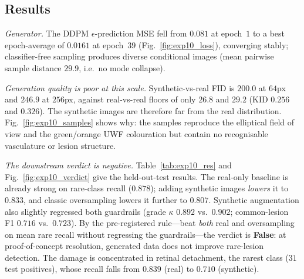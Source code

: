\documentclass[journal,twoside,web]{ieeecolor}
\begin{document}
\subsection{Results}
\emph{Generator.} The DDPM $\epsilon$-prediction MSE fell from $0.081$ at epoch~$1$ to
a best epoch-average of $\mathbf{0.0161}$ at epoch~$39$ (Fig.~\ref{fig:exp10_loss}),
converging stably; classifier-free sampling produces diverse conditional images (mean
pairwise sample distance $29.9$, i.e.\ no mode collapse).

\emph{Generation quality is poor at this scale.} Synthetic-vs-real FID is $200.0$ at
$64$px and $246.9$ at $256$px, against real-vs-real floors of only $26.8$ and $29.2$
(KID $0.256$ and $0.326$). The synthetic images are therefore far from the real
distribution. Fig.~\ref{fig:exp10_samples} shows why: the samples reproduce the
elliptical field of view and the green/orange UWF colouration but contain no
recognisable vasculature or lesion structure.

\emph{The downstream verdict is negative.} Table~\ref{tab:exp10_res} and
Fig.~\ref{fig:exp10_verdict} give the held-out-test results. The real-only baseline
is already strong on rare-class recall ($0.878$); adding synthetic images
\emph{lowers} it to $0.833$, and classic oversampling lowers it further to $0.807$.
Synthetic augmentation also slightly regressed both guardrails (grade $\kappa$
$0.892$ vs.\ $0.902$; common-lesion F1 $0.716$ vs.\ $0.723$). By the pre-registered
rule---beat \emph{both} real and oversampling on mean rare recall without regressing
the guardrails---the verdict is \textbf{False}: at proof-of-concept resolution,
generated data does not improve rare-lesion detection. The damage is concentrated in
retinal detachment, the rarest class ($31$ test positives), whose recall falls from
$0.839$ (real) to $0.710$ (synthetic).
\end{document}
